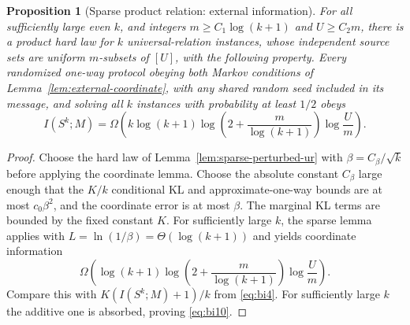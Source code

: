 \documentclass[11pt,letterpaper]{article}
\newtheorem{proposition}[theorem]{Proposition}
\numberwithin{equation}{section}
\begin{document}
\begin{proposition}[Sparse product relation: external information]
\label{prop:block-information}
For all sufficiently large even $k$, and integers $m\ge C_1\log(k+1)$ and $U\ge C_2m$, there is a product hard law for $k$ universal-relation instances, whose independent source sets are uniform $m$-subsets of $[U]$, with the following property.
Every randomized one-way protocol obeying both Markov conditions of Lemma~\ref{lem:external-coordinate}, with any shared random seed included in its message, and solving all $k$ instances with probability at least $1/2$ obeys
\begin{equation}
I(S^k;M)=\Omega\!\left(
  k\log(k+1)\log\left(2+\frac m{\log(k+1)}\right)\log\frac Um
 \right).
 \label{eq:bi10}
\end{equation}
\end{proposition}
\begin{proof}
Choose the hard law of Lemma~\ref{lem:sparse-perturbed-ur} with $\beta=C_\beta/\sqrt k$ before applying the coordinate lemma.
Choose the absolute constant $C_\beta$ large enough that the $K/k$ conditional KL and approximate-one-way bounds are at most $c_0\beta^2$, and the coordinate error is at most $\beta$.
The marginal KL terms are bounded by the fixed constant $K$.
For sufficiently large $k$, the sparse lemma applies with $L=\ln(1/\beta)=\Theta(\log(k+1))$ and yields coordinate information
\[
 \Omega\!\left(
 \log(k+1)\log\left(2+\frac m{\log(k+1)}\right)\log\frac Um
 \right).
\]
Compare this with $K(I(S^k;M)+1)/k$ from \eqref{eq:bi4}.
For sufficiently large $k$ the additive one is absorbed, proving \eqref{eq:bi10}.
\end{proof}
\end{document}
